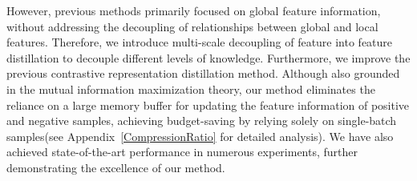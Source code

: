 However, previous methods primarily focused on global feature information, without addressing the decoupling of relationships between global and local features. 
Therefore, we introduce multi-scale decoupling of feature into feature distillation to decouple different levels of knowledge.
Furthermore, we improve the previous contrastive representation distillation method.
Although also grounded in the mutual information maximization theory, our method eliminates the reliance on a large memory buffer for updating the feature information of positive and negative samples, achieving budget-saving by relying solely on single-batch samples(see Appendix~\ref{CompressionRatio} for detailed analysis).
We have also achieved state-of-the-art performance in numerous experiments, further demonstrating the excellence of our method.